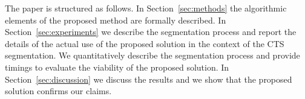The paper is structured as follows. In Section~\ref{sec:methods} the
algorithmic elements of the proposed method are formally described. In
Section~\ref{sec:experiments} we describe the segmentation process and
report the details of the actual use of the proposed solution in the
context of the CTS segmentation. We quantitatively describe the
segmentation process and provide timings to evaluate the viability of
the proposed solution. In Section~\ref{sec:discussion} we discuss the
results and we show that the proposed solution confirms our claims. 


